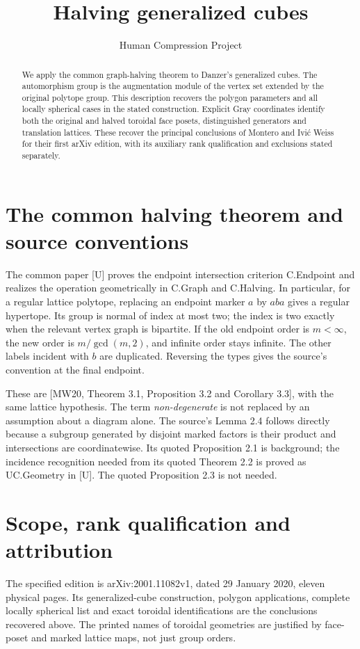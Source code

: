 
\title{Halving generalized cubes}
\author{Human Compression Project}
\date{}

\maketitle
\begin{abstract}
We apply the common graph-halving theorem to Danzer's generalized
cubes. The automorphism group is the augmentation module of the vertex
set extended by the original polytope group. This description recovers
the polygon parameters and all locally spherical cases in the stated
construction. Explicit Gray coordinates identify both the original and
halved toroidal face posets, distinguished generators and translation
lattices. These recover the principal conclusions of Montero and
Ivi\'c Weiss for their first arXiv edition, with its auxiliary rank
qualification and exclusions stated separately.
\end{abstract}
\section{The common halving theorem and source conventions}
The common paper [U] proves the endpoint intersection criterion
C.Endpoint and realizes the operation geometrically in C.Graph and
C.Halving. In particular, for a regular lattice polytope, replacing an
endpoint marker $a$ by $aba$ gives a regular hypertope. Its group is
normal of index at most two; the index is two exactly when the relevant
vertex graph is bipartite. If the old endpoint order is $m<\infty$, the
new order is $m/\gcd(m,2)$, and infinite order stays infinite.
The other labels incident with $b$ are duplicated. Reversing the types
gives the source's convention at the final endpoint.

These are [MW20, Theorem 3.1, Proposition 3.2 and Corollary 3.3], with
the same lattice hypothesis. The term \emph{non-degenerate} is not
replaced by an assumption about a diagram alone. The source's
Lemma 2.4 follows directly because a subgroup generated by disjoint
marked factors is their product and intersections are coordinatewise.
Its quoted Proposition 2.1 is background; the incidence recognition
needed from its quoted Theorem 2.2 is proved as UC.Geometry in [U].
The quoted Proposition 2.3 is not needed.


\section{Scope, rank qualification and attribution}
The specified edition is arXiv:2001.11082v1, dated 29 January 2020,
eleven physical pages. Its generalized-cube construction, polygon
applications, complete locally spherical list and exact toroidal
identifications are the conclusions recovered above. The printed
names of toroidal geometries are justified by face-poset and marked
lattice maps, not just group orders.

